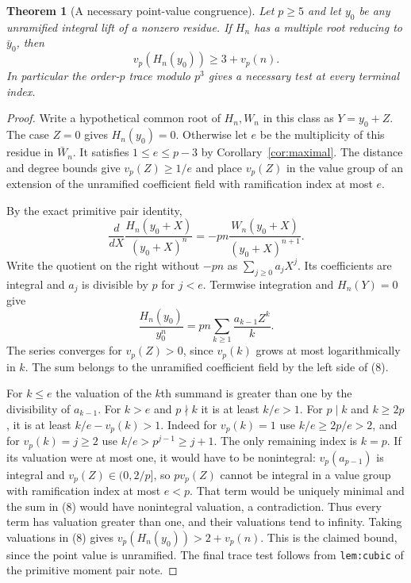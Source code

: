 \documentclass[11pt]{article}
\newtheorem{theorem}{Theorem}\newtheorem{lemma}[theorem]{Lemma}
\begin{document}
\begin{theorem}[A necessary point-value congruence]\label{thm:third-precision}
Let $p\ge5$ and let $y_0$ be any unramified integral lift of a
nonzero residue. If $H_n$ has a multiple root reducing to
$\bar y_0$, then
\[
                    v_p(H_n(y_0))\ge 3+v_p(n).
\]
In particular the order-$p$ trace modulo $p^3$ gives a
necessary test at every terminal index.
\end{theorem}
\begin{proof}
Write a hypothetical common root of $H_n,W_n$ in this class
as $Y=y_0+Z$. The case $Z=0$ gives $H_n(y_0)=0$.
Otherwise let $e$ be the multiplicity of this residue in
$\bar W_n$. It satisfies $1\le e\le p-3$ by
Corollary~\ref{cor:maximal}. The distance and degree bounds
give $v_p(Z)\ge1/e$ and place $v_p(Z)$ in the value group
of an extension of the unramified coefficient field with
ramification index at most $e$.

By the exact primitive pair identity,
\[
 \frac{d}{dX}\frac{H_n(y_0+X)}{(y_0+X)^n}
           =-pn\frac{W_n(y_0+X)}{(y_0+X)^{n+1}}.
\]
Write the quotient on the right without $-pn$ as
$\sum_{j\ge0}a_jX^j$. Its coefficients are integral and
$a_j$ is divisible by $p$ for $j<e$.
Termwise integration and $H_n(Y)=0$ give
\[
 \frac{H_n(y_0)}{y_0^n}
                =pn\sum_{k\ge1}\frac{a_{k-1}Z^k}{k}.
 \tag{8}
\]
The series converges for $v_p(Z)>0$, since $v_p(k)$
grows at most logarithmically in $k$.
The sum belongs to the unramified coefficient field by
the left side of (8).

For $k\le e$ the valuation of the $k$th summand is greater
than one by the divisibility of $a_{k-1}$.
For $k>e$ and $p\nmid k$ it is at least $k/e>1$.
For $p\mid k$ and $k\ge2p$, it is at least
$k/e-v_p(k)>1$. Indeed for $v_p(k)=1$ use $k/e\ge2p/e>2$,
and for $v_p(k)=j\ge2$ use $k/e>p^{j-1}\ge j+1$.
The only remaining index is $k=p$.
If its valuation were at most one, it would have to be
nonintegral: $v_p(a_{p-1})$ is integral and
$v_p(Z)\in(0,2/p]$, so $p v_p(Z)$ cannot be integral in a
value group with ramification index at most $e<p$.
That term would be uniquely minimal and the sum in (8)
would have nonintegral valuation, a contradiction.
Thus every term has valuation greater than one, and their
valuations tend to infinity. Taking valuations in (8)
gives $v_p(H_n(y_0))>2+v_p(n)$.
This is the claimed bound, since the point value is unramified.
The final trace test follows from \texttt{lem:cubic} of the
primitive moment pair note.
\end{proof}
\end{document}

